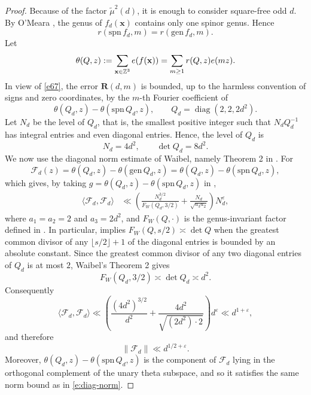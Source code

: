 \documentclass[12pt,a4paper,reqno]{amsart}
\numberwithin{equation}{section}
\def\Z{{\mathbb Z}}
\theoremstyle{plain}
\theoremstyle{definition}
\begin{document}
\begin{proof}
Because of the factor $\widetilde\mu^2(d)$, it is enough to consider square-free odd $d$. By O'Meara \cite[Theorem 102:10]{OM}, the genus of
\(
f_d(\mathbf x)
\)
contains only one spinor genus. Hence
\[
r(\mathrm{spn}\,f_d,m)=r(\mathrm{gen}\,f_d,m).
\]
Let 
\[
\theta(Q,z):=\sum_{{\bf x} \in \Z^3} e(f({\bf x}))=\sum_{m \geq1}r(Q,z)e(mz).
\]
In view of \eqref{e67}, the error $\mathbf R(d,m)$ is bounded, up to the harmless convention of signs and zero coordinates, by the $m$-th Fourier coefficient of
\[
\theta(Q_d,z)-\theta(\mathrm{spn}\,Q_d,z),
\qquad
Q_d=\operatorname{diag}(2,2,2d^2).
\]
Let $N_d$ be the level of $Q_d$, that is, the smallest positive integer such that $N_dQ_d^{-1}$ has integral entries and even diagonal entries. Hence, the level of $Q_d$ is
\[
N_d=4d^2,
\qquad
\det Q_d=8d^2.
\]
We now use the diagonal norm estimate of Waibel, namely Theorem 2 in \cite{Wa}. For
\[
\mathcal F_d(z)=\theta(Q_d,z)-\theta(\mathrm{gen}\,Q_d,z)=\theta(Q_d,z)-\theta(\mathrm{spn}\,Q_d,z),
\]
which gives, by taking $g=\theta(Q_d,z)-\theta(\mathrm{spn}\,Q_d,z)$ in \cite[Theorem 2]{Wa},
\begin{align*}
\langle\mathcal F_d,\mathcal F_d\rangle
&\ll
\left(
\frac{N_d^{3/2}}{F_W(Q_d,3/2)}+
\frac{N_d}{\sqrt{a_3a_2}}
\right)N_d^\varepsilon,
\end{align*}
where $a_1=a_2=2$ and $a_3=2d^2$, and $F_W(Q,\cdot)$ is the genus-invariant factor defined in \cite[(6)]{Wa}. In particular, \cite[Theorem 2]{Wa} implies
$F_W(Q,s/2)\asymp\det Q$ when the greatest common divisor of any $\lfloor s/2\rfloor+1$ of the diagonal entries is bounded by an absolute constant. Since the greatest common divisor of any two diagonal entries of $Q_d$ is at most $2$, Waibel's Theorem 2 gives
\[
F_W(Q_d,3/2)\asymp \det Q_d\asymp d^2.
\]
Consequently
\[
\langle\mathcal F_d,\mathcal F_d\rangle
\ll
\left(\frac{(4d^2)^{3/2}}{d^2}+
\frac{4d^2}{\sqrt{(2d^2)\cdot2}}
\right)d^\varepsilon
\ll d^{1+\varepsilon},
\]
and therefore
\begin{equation}\label{e:diag-norm}
\|\mathcal F_d\|\ll d^{1/2+\varepsilon}.
\end{equation}
Moreover,
$\theta(Q_d,z)-\theta(\mathrm{spn}\,Q_d,z)$ is the component of $\mathcal F_d$ lying in the orthogonal complement of the unary theta subspace, and so it satisfies the same norm bound as in \eqref{e:diag-norm}.


\end{proof}
\end{document}
